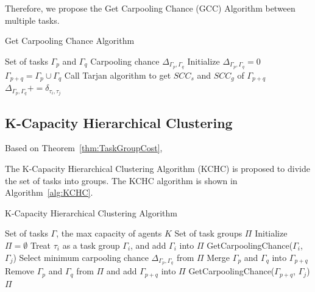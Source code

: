 \documentclass[sigconf,anonymous]{aamas}
\begin{document}
Therefore, we propose the Get Carpooling Chance (GCC) Algorithm between multiple tasks.

\begin{algorithm}
\caption{Get Carpooling Chance Algorithm}
\label{alg:GCC}
\begin{algorithmic}[1]
\Require Set of tasks $\Gamma_p$ and $\Gamma_q$ %
\Ensure Carpooling chance $\Delta_{\Gamma_p, \Gamma_q}$ %
\State Initialize $\Delta_{\Gamma_p, \Gamma_q} = 0$
\State $\Gamma_{p+q} = \Gamma_p \cup \Gamma_q$
\State Call Tarjan algorithm to get $SCC_s$ and $SCC_g$ of $\Gamma_{p+q}$
            \State $\Delta_{\Gamma_p, \Gamma_q} += \delta_{\tau_i, \tau_j}$
        \EndFor
    \EndFor
\EndFor
\end{algorithmic}
\end{algorithm}

\subsection{K-Capacity Hierarchical Clustering}

Based on Theorem~\ref{thm:TaskGroupCost},

The K-Capacity Hierarchical Clustering Algorithm (KCHC)
is proposed to divide the set of tasks into groups.
The KCHC algorithm is shown in Algorithm~\ref{alg:KCHC}.

\begin{algorithm}[ht]
\caption{K-Capacity Hierarchical Clustering Algorithm}
\label{alg:KCHC}

\begin{algorithmic}[1]
\Require Set of tasks $\Gamma$, the max capacity of agents $K$ %
\Ensure Set of task groups ${\Pi}$ %
\State Initialize ${\Pi} = \emptyset$
    \State Treat $\tau_{i}$ as a task group $\Gamma_{i}$, and add $\Gamma_{i}$ into ${\Pi}$
        \State GetCarpoolingChance($\Gamma_{i}$, $\Gamma_{j}$)
    \EndFor
\EndFor
{}
    \State Select minimum carpooling chance $\Delta_{\Gamma_p, \Gamma_q}$ from $\Pi$
    \State Merge $\Gamma_p$ and $\Gamma_q$ into $\Gamma_{p+q}$
    \State Remove $\Gamma_p$ and $\Gamma_q$ from $\Pi$ and add $\Gamma_{p+q}$ into $\Pi$
            \State GetCarpoolingChance($\Gamma_{p+q}$, $\Gamma_{j}$)
        \EndIf
    \EndFor
\EndWhile
\State \Return $\Pi$
\end{algorithmic}
\end{algorithm}
\end{document}
